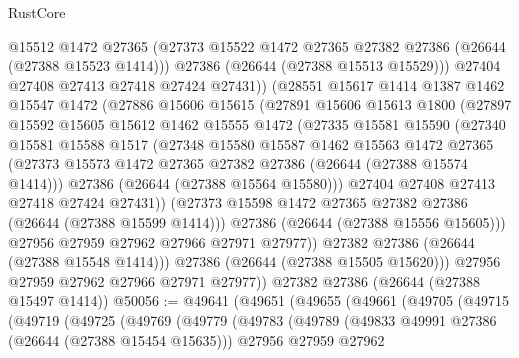 \begin{lexlean}{RustCore}
\begin{coremodule}
                @15512
                @1472
                @27365
                (@27373 @15522 @1472 @27365 @27382 @27386 (@26644 (@27388 @15523 @1414)))
                @27386
                (@26644 (@27388 @15513 @15529)))
              @27404
              @27408
              @27413
              @27418
              @27424
              @27431))
          (@28551
            @15617
            @1414
            @1387
            @1462
            @15547
            @1472
            (@27886
              @15606
              @15615
              (@27891
                @15606
                @15613
                @1800
                (@27897
                  @15592
                  @15605
                  @15612
                  @1462
                  @15555
                  @1472
                  (@27335
                    @15581
                    @15590
                    (@27340
                      @15581
                      @15588
                      @1517
                      (@27348
                        @15580
                        @15587
                        @1462
                        @15563
                        @1472
                        @27365
                        (@27373 @15573 @1472 @27365 @27382 @27386 (@26644 (@27388 @15574 @1414)))
                        @27386
                        (@26644 (@27388 @15564 @15580)))
                      @27404
                      @27408
                      @27413
                      @27418
                      @27424
                      @27431))
                  (@27373 @15598 @1472 @27365 @27382 @27386 (@26644 (@27388 @15599 @1414)))
                  @27386
                  (@26644 (@27388 @15556 @15605)))
                @27956
                @27959
                @27962
                @27966
                @27971
                @27977))
            @27382
            @27386
            (@26644 (@27388 @15548 @1414)))
          @27386
          (@26644 (@27388 @15505 @15620)))
        @27956
        @27959
        @27962
        @27966
        @27971
        @27977))
    @27382
    @27386
    (@26644 (@27388 @15497 @1414))
@50056 := @49641
    (@49651
      (@49655
        (@49661
          (@49705
            (@49715
              (@49719
                (@49725
                  (@49769
                    (@49779
                      (@49783
                        (@49789
                          (@49833 @49991 @27386 (@26644 (@27388 @15454 @15635)))
                          @27956
                          @27959
                          @27962

\end{coremodule}
\end{lexlean}
